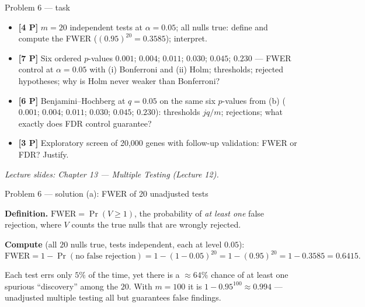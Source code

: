 \documentclass[aspectratio=169,11pt]{beamer}
\begin{document}
\begin{frame}{Problem 6 --- task}
  \begin{exercise}
    \begin{itemize}
      \item[(a)] \textbf{[4 P]} $m=20$ independent tests at $\alpha=0.05$; all nulls true:
        define and compute the FWER ($(0.95)^{20}=0.3585$); interpret.
      \item[(b)] \textbf{[7 P]} Six ordered $p$-values
        $0.001$; $0.004$; $0.011$; $0.030$; $0.045$; $0.230$ --- FWER control at $\alpha=0.05$
        with (i) Bonferroni and (ii) Holm; thresholds; rejected hypotheses; why is Holm never
        weaker than Bonferroni?
      \item[(c)] \textbf{[6 P]} Benjamini--Hochberg at $q=0.05$ on the same six $p$-values from (b)
        ($0.001$; $0.004$; $0.011$; $0.030$; $0.045$; $0.230$):
        thresholds $jq/m$; rejections; what exactly does FDR control guarantee?
      \item[(d)] \textbf{[3 P]} Exploratory screen of 20{,}000 genes with follow-up validation:
        FWER or FDR? Justify.
    \end{itemize}
  \end{exercise}
  {\scriptsize\itshape Lecture slides: Chapter 13 --- Multiple Testing (Lecture 12).}
\end{frame}

\begin{frame}{Problem 6 --- solution (a): FWER of 20 unadjusted tests}
  \begin{solutionbox}
    \textbf{Definition.} $\text{FWER}=\Pr(V\ge1)$, the probability of \emph{at least one} false
    rejection, where $V$ counts the true nulls that are wrongly rejected.
    \medskip

    \textbf{Compute} (all $20$ nulls true, tests independent, each at level $0.05$):
    \[
      \text{FWER}=1-\Pr(\text{no false rejection})=1-(1-0.05)^{20}=1-(0.95)^{20}
      =1-0.3585=\mathbf{0.6415}.
    \]
  \end{solutionbox}
  \begin{takeaway}[Interpretation]
    \footnotesize Each test errs only $5\%$ of the time, yet there is a $\approx64\%$ chance of at
    least one spurious ``discovery'' among the $20$. With $m=100$ it is
    $1-0.95^{100}\approx0.994$ --- unadjusted multiple testing all but guarantees false findings.
  \end{takeaway}
\end{frame}
\end{document}
